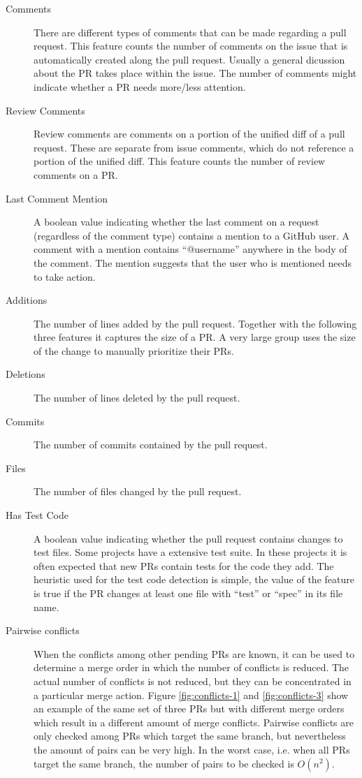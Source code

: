 \begin{description}
\item[Comments]
There are different types of comments that can be made regarding a pull request.
This feature counts the number of comments on the issue that is automatically created along the pull request.
Usually a general dicussion about the PR takes place within the issue.
The number of comments might indicate whether a PR needs more/less attention.

\item[Review Comments]
Review comments are comments on a portion of the unified diff of a pull request.
These are separate from issue comments, which do not reference a portion of the unified diff.
This feature counts the number of review comments on a PR.

\item[Last Comment Mention]
A boolean value indicating whether the last comment on a request (regardless of the comment type) contains a mention to a GitHub user.
A comment with a mention contains ``@username'' anywhere in the body of the comment.
The mention suggests that the user who is mentioned needs to take action.

\item[Additions]
The number of lines added by the pull request.
Together with the following three features it captures the size of a PR.
A very large group uses the size of the change to manually prioritize their PRs.

\item[Deletions]
The number of lines deleted by the pull request.

\item[Commits]
The number of commits contained by the pull request.

\item[Files]
The number of files changed by the pull request.

\item[Has Test Code]
A boolean value indicating whether the pull request contains changes to test files.
Some projects have a extensive test suite.
In these projects it is often expected that new PRs contain tests for the code they add.
The heuristic used for the test code detection is simple, the value of the feature is true if the PR changes at least one file with ``test'' or ``spec'' in its file name.

\item[Pairwise conflicts]
When the conflicts among other pending PRs are known, it can be used to determine a merge order in which the number of conflicts is reduced.
The actual number of conflicts is not reduced, but they can be concentrated in a particular merge action.
Figure \ref{fig:conflicts-1} and \ref{fig:conflicts-3} show an example of the same set of three PRs but with different merge orders which result in a different amount of merge conflicts.
Pairwise conflicts are only checked among PRs which target the same branch, but nevertheless the amount of pairs can be very high.
In the worst case, i.e. when all PRs target the same branch, the number of pairs to be checked is $O(n^2)$.


\end{description}
